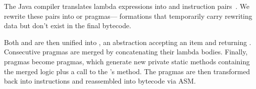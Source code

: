 The Java compiler translates lambda expressions into  and  instruction pairs~\citep{rose2009bytecodes}.
We re\-write these pairs into  or  pragmas---\phic{} formations that temporarily carry rewriting data but don't exist in the final bytecode.

Both  and  are then unified into , an abstraction accepting an item and returning .
Consecutive  pragmas are merged by concatenating their lambda bodies.
Finally,  pragmas become  pragmas, which generate new private static methods containing the merged logic plus a call to the 's  method.
The pragmas are then transformed back into instructions and reassembled into bytecode via ASM.
